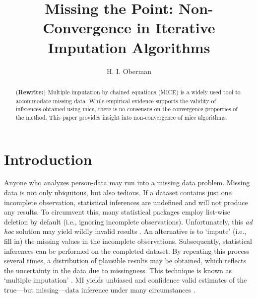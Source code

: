 \documentclass[Royal,times,sageh]{sagej}
\begin{document}
\title{Missing the Point: Non-Convergence in Iterative Imputation Algorithms}


\author{H. I. Oberman}




\begin{abstract}
(\textbf{Rewrite:}) Multiple imputation by chained equations (MICE) is a
widely used tool to accommodate missing data. While empirical evidence
supports the validity of inferences obtained using mice, there is no
consensus on the convergence properties of the method. This paper
provides insight into non-convergence of mice algorithms.
\end{abstract}


\maketitle

\hypertarget{introduction}{%
\section{Introduction}\label{introduction}}

Anyone who analyzes person-data may run into a missing data problem.
Missing data is not only ubiquitous, but also tedious. If a dataset
contains just one incomplete observation, statistical inferences are
undefined and will not produce any results. To circumvent this, many
statistical packages employ list-wise deletion by default (i.e.,
ignoring incomplete observations). Unfortunately, this \emph{ad hoc}
solution may yield wildly invalid results \citep{buur18}. An alternative
is to `impute' (i.e., fill in) the missing values in the incomplete
observations. Subsequently, statistical inferences can be performed on
the completed dataset. By repeating this process several times, a
distribution of plausible results may be obtained, which reflects the
uncertainty in the data due to missingness. This technique is known as
`multiple imputation' \citep[MI;][]{rubin76}. MI yields unbiased and
confidence valid estimates of the true---but missing---data inference
under many circumstances \citep{buur18}.
\end{document}
